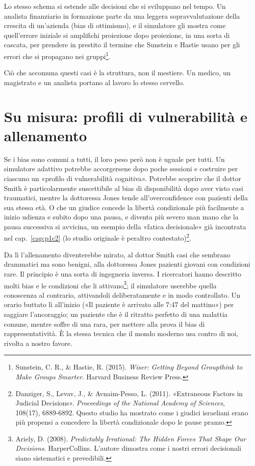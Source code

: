 Lo stesso schema si estende alle decisioni che si sviluppano nel tempo. Un analista finanziario in formazione parte da una leggera sopravvalutazione della crescita di un'azienda (bias di ottimismo), e il simulatore gli mostra come quell'errore iniziale si amplifichi proiezione dopo proiezione, in una sorta di cascata, per prendere in prestito il termine che Sunstein e Hastie usano per gli errori che si propagano nei gruppi\footnote{Sunstein, C. R., \& Hastie, R. (2015). \textit{Wiser: Getting Beyond Groupthink to Make Groups Smarter}. Harvard Business Review Press.}.

Ciò che accomuna questi casi è la struttura, non il mestiere. Un medico, un magistrato e un analista portano al lavoro lo stesso cervello.

\section{Su misura: profili di vulnerabilità e allenamento}
\label{sec:p4c33-su-misura-profili}
Se i bias sono comuni a tutti, il loro peso però non è uguale per tutti. Un simulatore adattivo potrebbe accorgersene dopo poche sessioni e costruire per ciascuno un «profilo di vulnerabilità cognitiva». Potrebbe scoprire che il dottor Smith è particolarmente suscettibile al bias di disponibilità dopo aver visto casi traumatici, mentre la dottoressa Jones tende all'overconfidence con pazienti della sua stessa età. O che un giudice concede la libertà condizionale più facilmente a inizio udienza e subito dopo una pausa, e diventa più severo man mano che la pausa successiva si avvicina, un esempio della «fatica decisionale» già incontrata nel cap.~\ref{cap:p1c2} (lo studio originale è peraltro contestato)\footnote{Danziger, S., Levav, J., \& Avnaim-Pesso, L. (2011). «Extraneous Factors in Judicial Decisions». \textit{Proceedings of the National Academy of Sciences}, 108(17), 6889-6892. Questo studio ha mostrato come i giudici israeliani erano più propensi a concedere la libertà condizionale dopo le pause pranzo.}.

Da lì l'allenamento diventerebbe mirato, al dottor Smith casi che sembrano drammatici ma sono benigni, alla dottoressa Jones pazienti giovani con condizioni rare. Il principio è una sorta di ingegneria inversa. I ricercatori hanno descritto molti bias e le condizioni che li attivano\footnote{Ariely, D. (2008). \textit{Predictably Irrational: The Hidden Forces That Shape Our Decisions}. HarperCollins. L'autore dimostra come i nostri errori decisionali siano sistematici e prevedibili.}; il simulatore userebbe quella conoscenza al contrario, attivandoli deliberatamente e in modo controllato. Un orario buttato lì all'inizio («Il paziente è arrivato alle 7:47 del mattino») per saggiare l'ancoraggio; un paziente che è il ritratto perfetto di una malattia comune, mentre soffre di una rara, per mettere alla prova il bias di rappresentatività. È la stessa tecnica che il mondo moderno usa contro di noi, rivolta a nostro favore.

